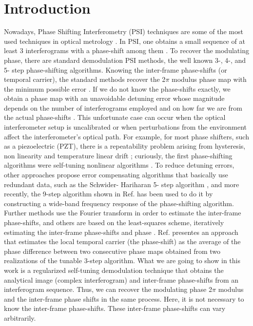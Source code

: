 \documentclass[letterpaper,12pt]{article}   %
\begin{document}
\section{Introduction}
Nowadays, Phase Shifting Interferometry (PSI) techniques are some of
the most used techniques in optical metrology
\cite{a1_OpticalTesting}. In PSI, one obtains a small sequence of at
least 3 interferograms with a phase-shift among them
\cite{a1_OpticalTesting}. To recover the modulating phase, there are
standard demodulation PSI methods, the well known 3-, 4-, and 5- step
phase-shifting algorithms.  Knowing the inter-frame phase-shifts (or
temporal carrier), the standard methods recover the 2$\pi$ modulus
phase map with the minimum possible error
\cite{a1_OpticalTesting,a2_F&K,a3}. If we do not know the phase-shifts
exactly, we obtain a phase map with an unavoidable detuning error
whose magnitude depends on the number of interferograms employed and
on how far we are from the actual phase-shifts
\cite{a3,a4,a5,a6}. This unfortunate case can occur when the optical
interferometer setup is uncalibrated or when perturbations from the
environment affect the interferometer's optical path. For example, for
most phase shifters, such as a piezoelectric (PZT), there is a
repeatability problem arising from hysteresis, non linearity and
temperature linear drift \cite{a5,a7}; curiously, the first
phase-shifting algorithms were self-tuning nonlinear algorithms
\cite{a8,a9}. To reduce detuning errors, other approaches propose
error compensating algorithms that basically use redundant data, such
as the Schwider- Hariharan 5- step algorithm \cite{a4,a10,a11}, and
more recently, the 9-step algorithm shown in Ref. \cite{a12} has been
used to do it by constructing a wide-band frequency response of the
phase-shifting algorithm. Further methods use the Fourier transform in
order to estimate the inter-frame phase-shifts, and others are based
on the least-squares scheme, iteratively estimating the inter-frame
phase-shifts and phase \cite{a13,a14}.  Ref. \cite{a16} presentes an
approach that estimates the local temporal carrier (the phase-shift)
as the average of the phase difference between two consecutive phase
maps obtained from two realizations of the tunable 3-step
algorithm. What we are going to show in this work is a regularized
self-tuning demodulation technique that obtains the analytical image
(complex interferogram) and inter-frame phase-shifts from an
interferogram sequence. Thus, we can recover the modulating phase
2$\pi$ modulus and the inter-frame phase shifts in the same
process. Here, it is not necessary to know the inter-frame
phase-shifts. These inter-frame phase-shifts can vary arbitrarily.
\end{document}
